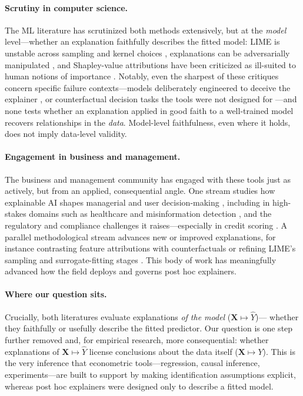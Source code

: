 \documentclass[12pt,letterpaper]{article}
\newcommand{\Xto}{\mathbf{X}\mapsto Y}
\newcommand{\Xtohat}{\mathbf{X}\mapsto \hat{Y}}
\begin{document}
\paragraph{Scrutiny in computer science.}
The ML literature has scrutinized both methods extensively, but at the \emph{model}
level---whether an explanation faithfully describes the fitted model: LIME is
unstable across sampling and kernel choices
\citep{garreau2020looking,alvarez18robustness}, explanations can be adversarially
manipulated \citep{slack19fooling}, and Shapley-value attributions have been
criticized as ill-suited to human notions of importance \citep{kumar20shap,han22which}.
Notably, even the sharpest of these critiques concern specific failure
contexts---models deliberately engineered to deceive the explainer
\citep{slack19fooling}, or counterfactual decision tasks the tools were not
designed for \citep{fernandez20explaining}---and none tests whether an explanation
applied in good faith to a well-trained model recovers relationships in the
\emph{data}.
Model-level faithfulness, even where it holds, does not imply data-level validity.

\vspace{-3mm}
\paragraph{Engagement in business and management.}
The business and management community has engaged with these tools just as
actively, but from an applied, consequential angle. One stream studies how
explainable AI shapes managerial and user decision-making \citep{bauer23infoproc,
von2025knowing}, including in high-stakes domains such as healthcare
\citep{hassan25unlocking} and misinformation detection \citep{lee24false}, and the
regulatory and compliance challenges it raises---especially in credit scoring
\citep{mohammadi2025regulating,bucker2022transparency,chen2024interpretable}. A
parallel methodological stream advances new or improved explanations, for instance
contrasting feature attributions with counterfactuals \citep{fernandez20explaining}
or refining LIME's sampling and surrogate-fitting stages \citep{kim2023rolex}.
This body of work has meaningfully advanced how the field deploys and governs post
hoc explainers.


\vspace{-3mm}
\paragraph{Where our question sits.}
Crucially, both literatures evaluate explanations \emph{of the model} ($\Xtohat$)---
whether they faithfully or usefully describe the fitted predictor. Our question is
one step further removed and, for empirical research, more consequential: whether
explanations of $\Xtohat$ license conclusions about the data itself ($\Xto$). This
is the very inference that econometric tools---regression, causal inference,
experiments---are built to support by making identification assumptions explicit,
whereas post hoc explainers were designed only to describe a fitted model.
\end{document}
